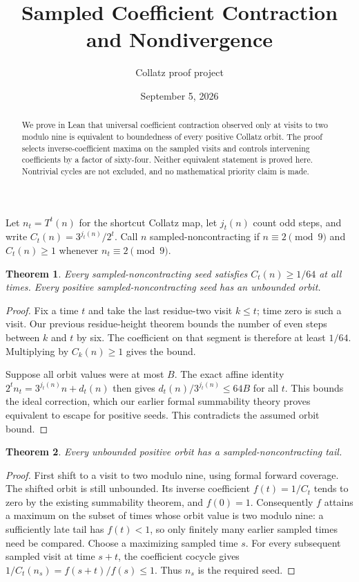 \documentclass[10pt]{article}
\title{Sampled Coefficient Contraction and Nondivergence}
\author{Collatz proof project}
\date{September 5, 2026}
\newtheorem{theorem}{Theorem}
\begin{document}
\maketitle
\begin{abstract}
We prove in Lean that universal coefficient contraction observed only at
visits to two modulo nine is equivalent to boundedness of every positive
Collatz orbit. The proof selects inverse-coefficient maxima on the sampled
visits and controls intervening coefficients by a factor of sixty-four.
Neither equivalent statement is proved here. Nontrivial cycles are not
excluded, and no mathematical priority claim is made.
\end{abstract}
Let $n_t=T^t(n)$ for the shortcut Collatz map, let $j_t(n)$ count odd
steps, and write $C_t(n)=3^{j_t(n)}/2^t$.
Call $n$ sampled-noncontracting if $n\equiv2\pmod9$ and
$C_t(n)\geq1$ whenever $n_t\equiv2\pmod9$.

\begin{theorem}
Every sampled-noncontracting seed satisfies $C_t(n)\geq1/64$ at all times.
Every positive sampled-noncontracting seed has an unbounded orbit.
\end{theorem}
\begin{proof}
Fix a time $t$ and take the last residue-two visit $k\leq t$; time zero
is such a visit. Our previous residue-height theorem bounds the number
of even steps between $k$ and $t$ by six. The coefficient on that segment
is therefore at least $1/64$. Multiplying by $C_k(n)\geq1$ gives the bound.

Suppose all orbit values were at most $B$. The exact affine identity
$2^t n_t=3^{j_t(n)}n+d_t(n)$ then gives
$d_t(n)/3^{j_t(n)}\leq64B$ for all $t$.
This bounds the ideal correction, which our earlier formal summability
theory proves equivalent to escape for positive seeds. This contradicts
the assumed orbit bound.
\end{proof}

\begin{theorem}
Every unbounded positive orbit has a sampled-noncontracting tail.
\end{theorem}
\begin{proof}
First shift to a visit to two modulo nine, using formal forward coverage.
The shifted orbit is still unbounded. Its inverse coefficient
$f(t)=1/C_t$ tends to zero by the existing summability theorem, and
$f(0)=1$. Consequently $f$ attains a maximum on the subset of times
whose orbit value is two modulo nine: a sufficiently late tail has
$f(t)<1$, so only finitely many earlier sampled times need be compared.
Choose a maximizing sampled time $s$.
For every subsequent sampled visit at time $s+t$, the coefficient cocycle
gives $1/C_t(n_s)=f(s+t)/f(s)\leq1$. Thus $n_s$ is the required seed.
\end{proof}
\end{document}
